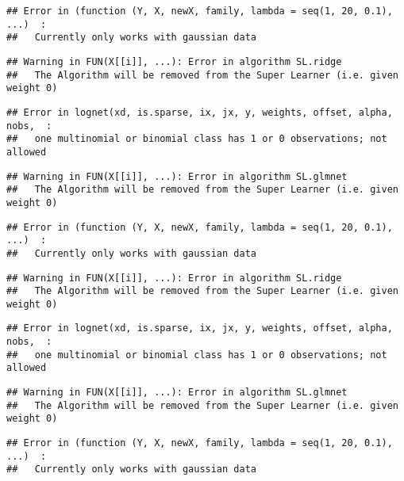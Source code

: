 \documentclass[
]{article}
\begin{document}
\begin{verbatim}
## Error in (function (Y, X, newX, family, lambda = seq(1, 20, 0.1), ...)  : 
##   Currently only works with gaussian data
\end{verbatim}

\begin{verbatim}
## Warning in FUN(X[[i]], ...): Error in algorithm SL.ridge 
##   The Algorithm will be removed from the Super Learner (i.e. given weight 0)
\end{verbatim}

\begin{verbatim}
## Error in lognet(xd, is.sparse, ix, jx, y, weights, offset, alpha, nobs,  : 
##   one multinomial or binomial class has 1 or 0 observations; not allowed
\end{verbatim}

\begin{verbatim}
## Warning in FUN(X[[i]], ...): Error in algorithm SL.glmnet 
##   The Algorithm will be removed from the Super Learner (i.e. given weight 0)
\end{verbatim}

\begin{verbatim}
## Error in (function (Y, X, newX, family, lambda = seq(1, 20, 0.1), ...)  : 
##   Currently only works with gaussian data
\end{verbatim}

\begin{verbatim}
## Warning in FUN(X[[i]], ...): Error in algorithm SL.ridge 
##   The Algorithm will be removed from the Super Learner (i.e. given weight 0)
\end{verbatim}

\begin{verbatim}
## Error in lognet(xd, is.sparse, ix, jx, y, weights, offset, alpha, nobs,  : 
##   one multinomial or binomial class has 1 or 0 observations; not allowed
\end{verbatim}

\begin{verbatim}
## Warning in FUN(X[[i]], ...): Error in algorithm SL.glmnet 
##   The Algorithm will be removed from the Super Learner (i.e. given weight 0)
\end{verbatim}

\begin{verbatim}
## Error in (function (Y, X, newX, family, lambda = seq(1, 20, 0.1), ...)  : 
##   Currently only works with gaussian data
\end{verbatim}
\end{document}
